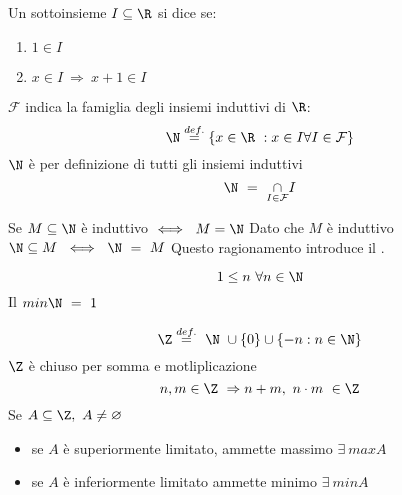 \documentclass[../analisi.tex]{subfiles}
\begin{document}
\begin{defn} 
	Un sottoinsieme $ I \subseteq \R $ si dice  se:
	\begin{enumerate}
   	\item $ 1 \in I $
	\item $ x \in I\ \Rightarrow\ x + 1 \in I $
        \end{enumerate}
	$ \mathcal{F} $ indica la famiglia degli insiemi induttivi di $\R $:
	\begin{equation}
		\N \overset{def.}{=} \{ x \in \R\ : x \in I \forall I \in \mathcal{F} \} 
	\end{equation}
$\N$ è per definizione  di tutti gli insiemi induttivi 
\begin{equation}
	\N\ =\ \underset{I \in \mathcal{F}}{\cap} I
\end{equation}
\end{defn}

\begin{dimo}
	Se $M \subseteq \N $ è induttivo $ \iff\ M=\N$ \newline
	Dato che $M$ è induttivo $\N \subseteq M\ \iff\ \N\ =\ M$ \newline
	Questo ragionamento introduce il .
\end{dimo}

\begin{defn}[Il minimo di $\N$]
	\begin{equation}
		1 \leq n \ \forall n \in \N
	\end{equation}
Il $min\N\ =\ 1$
\end{defn}

\begin{defn}

	\begin{equation}
	\Z \overset{def.}{=}\ \N\ \cup \{ 0 \} \cup \{ -n:n \in \N \}
	\end{equation}	
$\Z$ è chiuso per somma e motliplicazione
	\begin{equation}
	n,m \in \Z\ \Rightarrow n+m,\ n\cdot m\ \in \Z
	\end{equation}
Se $A \subseteq \Z,\ A \neq \varnothing$
\begin{itemize}
	\item se $A$ è superiormente limitato, ammette massimo $\exists\ maxA$
	\item se $A$ è inferiormente limitato ammette minimo $\exists\ minA$
\end{itemize}
\end{defn}
\end{document}
